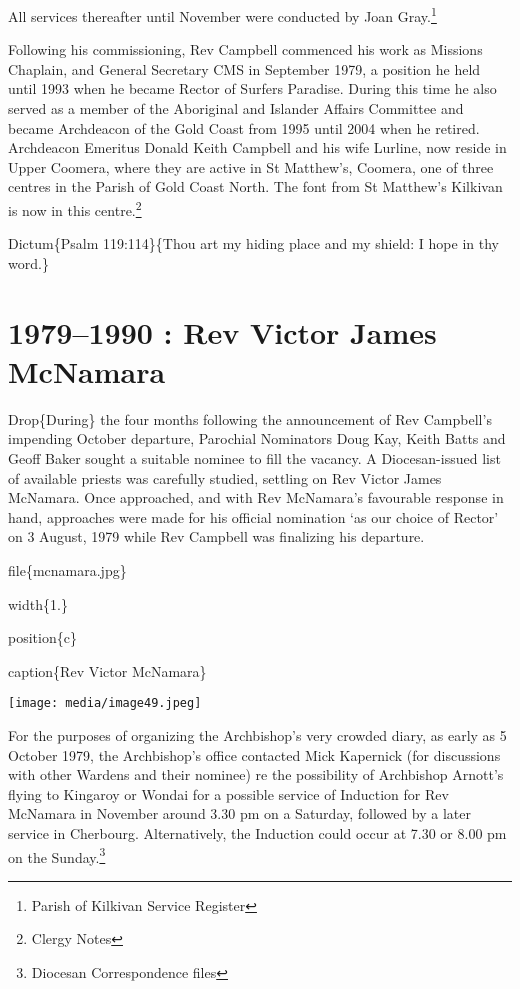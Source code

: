 All services thereafter until November were conducted by Joan Gray.\footnote{Parish of Kilkivan Service Register}

Following his commissioning, Rev Campbell commenced his work as Missions Chaplain, and General Secretary CMS in September 1979, a position he held until 1993 when he became Rector of Surfers Paradise. During this time he also served as a member of the Aboriginal and Islander Affairs Committee and became Archdeacon of the Gold Coast from 1995 until 2004 when he retired. Archdeacon Emeritus Donald Keith Campbell and his wife Lurline, now reside in Upper Coomera, where they are active in St Matthew's, Coomera, one of three centres in the Parish of Gold Coast North. The font from St Matthew's Kilkivan is now in this centre.\footnote{Clergy Notes}

Dictum\{Psalm 119:114\}\{Thou art my hiding place and my shield: I hope in thy word.\}

\hypertarget{rev-victor-james-mcnamara}{%
\chapter{1979--1990 : Rev Victor James McNamara}\label{rev-victor-james-mcnamara}}

Drop\{During\} the four months following the announcement of Rev Campbell's impending October departure, Parochial Nominators Doug Kay, Keith Batts and Geoff Baker sought a suitable nominee to fill the vacancy. A Diocesan-issued list of available priests was carefully studied, settling on Rev Victor James McNamara. Once approached, and with Rev McNamara's favourable response in hand, approaches were made for his official nomination `as our choice of Rector' on 3 August, 1979 while Rev Campbell was finalizing his departure.

file\{mcnamara.jpg\}

width\{1.\}

position\{c\}

caption\{Rev Victor McNamara\}

\texttt{[image: media/image49.jpeg]}

For the purposes of organizing the Archbishop's very crowded diary, as early as 5 October 1979, the Archbishop's office contacted Mick Kapernick (for discussions with other Wardens and their nominee) re the possibility of Archbishop Arnott's flying to Kingaroy or Wondai for a possible service of Induction for Rev McNamara in November around 3.30 pm on a Saturday, followed by a later service in Cherbourg. Alternatively, the Induction could occur at 7.30 or 8.00 pm on the Sunday.\footnote{Diocesan Correspondence files}

